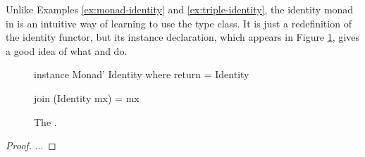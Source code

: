
\begin{example}
  \label{ex:monad-identity-haskell}

  Unlike Examples \ref{ex:monad-identity} and
  \ref{ex:triple-identity}, the identity monad in \hask is an
  intuitive way of learning to use the  type
  class. It is just a redefinition of the identity functor, but its
  instance declaration, which appears in Figure
  \ref{fig:monad-identity-haskell}, gives a good idea of what
   and  do.

  \begin{figure}[htbp]
    \begin{codehaskell}
instance Monad' Identity where
  return = Identity

  join (Identity mx) = mx
    \end{codehaskell}
    \caption{The  .}
    \label{fig:monad-identity-haskell}
  \end{figure}

  \begin{proof}

    ...

  \end{proof}

\end{example}

